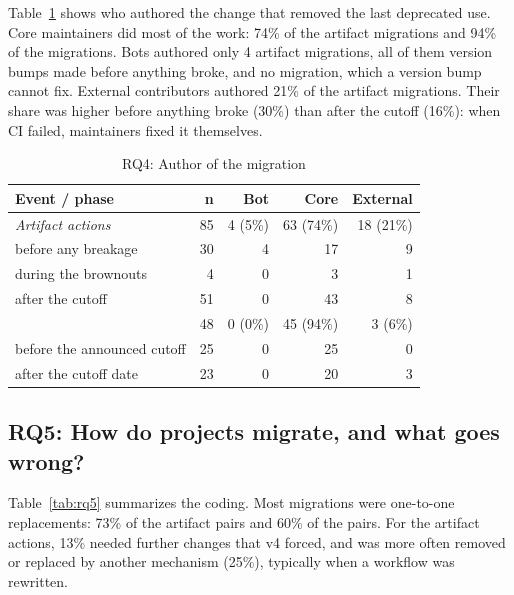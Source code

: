 Table~\ref{tab:authors} shows who authored the change that removed the last deprecated use.
Core maintainers did most of the work: 74\% of the artifact migrations and 94\% of the \so{} migrations.
Bots authored only 4 artifact migrations, all of them version bumps made before anything broke, and no \so{} migration, which a version bump cannot fix.
External contributors authored 21\% of the artifact migrations.
Their share was higher before anything broke (30\%) than after the cutoff (16\%): when CI failed, maintainers fixed it themselves.

\begin{table}[t]
\caption{RQ4: Author of the migration}\label{tab:authors}
\centering\footnotesize
\begin{tabular}{@{}lrrrr@{}}
\toprule
\textbf{Event / phase} & \textbf{n} & \textbf{Bot} & \textbf{Core} & \textbf{External} \\
\midrule
\textit{Artifact actions} & 85 & 4 (5\%) & 63 (74\%) & 18 (21\%) \\
\quad before any breakage & 30 & 4 & 17 & 9 \\
\quad during the brownouts & 4 & 0 & 3 & 1 \\
\quad after the cutoff & 51 & 0 & 43 & 8 \\
\midrule
\textit{\so{}} & 48 & 0 (0\%) & 45 (94\%) & 3 (6\%) \\
\quad before the announced cutoff & 25 & 0 & 25 & 0 \\
\quad after the cutoff date & 23 & 0 & 20 & 3 \\
\bottomrule
\end{tabular}
\end{table}


\subsection{RQ5: How do projects migrate, and what goes wrong?}\label{sec:rq5}

Table~\ref{tab:rq5} summarizes the coding.
Most migrations were one-to-one replacements: 73\% of the artifact pairs and 60\% of the \so{} pairs.
For the artifact actions, 13\% needed further changes that v4 forced, and \so{} was more often removed or replaced by another mechanism (25\%), typically when a workflow was rewritten.

